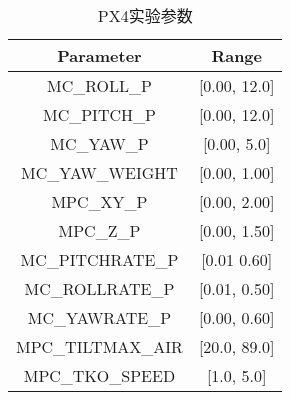 \begin{table}[htb]
\small
\caption{PX4实验参数}
\label{tab:fix_param_px4}
\centering
\begin{tabular}{cc}
        \toprule[1.5pt]
          Parameter & Range  \\
        \midrule[0.8pt]
         MC\_ROLL\_P & [0.00, 12.0]  \\
       
         MC\_PITCH\_P & [0.00, 12.0] \\ 
       
         MC\_YAW\_P & [0.00, 5.0]  \\ 
        
         MC\_YAW\_WEIGHT & [0.00, 1.00]  \\ 
        
         MPC\_XY\_P & [0.00, 2.00]  \\ 
        
         MPC\_Z\_P & [0.00, 1.50] \\ 
        
         MC\_PITCHRATE\_P & [0.01 0.60]  \\ 
        
         MC\_ROLLRATE\_P & [0.01, 0.50]   \\ 
        
         MC\_YAWRATE\_P & [0.00, 0.60]  \\ 
        
         MPC\_TILTMAX\_AIR & [20.0, 89.0]  \\ 
        
        
        
        
         MPC\_TKO\_SPEED & [1.0, 5.0]  \\
        
        \bottomrule[1.5pt]
\end{tabular}
\end{table}